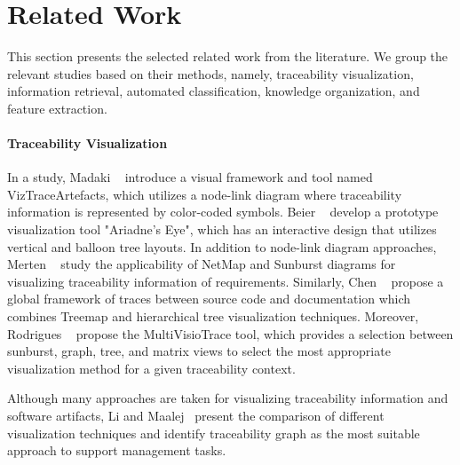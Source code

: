 \section{Related Work}
\label{sec:relwork}

This section presents the selected related work from the literature. We group the relevant studies based on their methods, namely, traceability visualization, information retrieval, automated classification, knowledge organization, and feature extraction.

\paragraph{Traceability Visualization} 
In a study, Madaki \etal{}~\cite{madaki-2022} introduce a visual framework and tool named VizTraceArtefacts, which utilizes a node-link diagram where traceability information is represented by color-coded symbols.
Beier \etal{}~\cite{beier-2017} develop a prototype visualization tool "Ariadne's Eye", which has an interactive design that utilizes vertical and balloon tree layouts. In addition to node-link diagram approaches, Merten \etal{}~\cite{merten-2011} study the applicability of NetMap and Sunburst diagrams for visualizing traceability information of requirements. Similarly, Chen \etal{}~\cite{chen-2012} propose a global framework of traces between source code and documentation which combines Treemap and hierarchical tree visualization techniques. Moreover, Rodrigues \etal{}~\cite{rodrigues-2016} propose the MultiVisioTrace tool, which provides a selection between sunburst, graph, tree, and matrix views to select the most appropriate visualization method for a given traceability context. 

Although many approaches are taken for visualizing traceability information and software artifacts, Li and Maalej~\cite{li-2012} present the comparison of different visualization techniques and identify traceability graph as the most suitable approach to support management tasks. 

